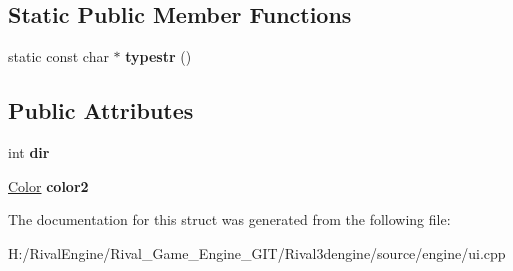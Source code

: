 \subsection*{Static Public Member Functions}
\begin{DoxyCompactItemize}
\item 
\mbox{\label{struct_u_i_1_1_gradient_a4ea53578f8b67fa10dc44a9646732561}} 
static const char $\ast$ {\bfseries typestr} ()
\end{DoxyCompactItemize}
\subsection*{Public Attributes}
\begin{DoxyCompactItemize}
\item 
\mbox{\label{struct_u_i_1_1_gradient_a1ab94b6c50df223a2716ac9b76a052cf}} 
int {\bfseries dir}
\item 
\mbox{\label{struct_u_i_1_1_gradient_a2be37ae45a06a0351a8c925c53a8e36f}} 
\hyperlink{struct_u_i_1_1_color}{Color} {\bfseries color2}
\end{DoxyCompactItemize}


The documentation for this struct was generated from the following file\+:\begin{DoxyCompactItemize}
\item 
H\+:/\+Rival\+Engine/\+Rival\+\_\+\+Game\+\_\+\+Engine\+\_\+\+G\+I\+T/\+Rival3dengine/source/engine/ui.\+cpp\end{DoxyCompactItemize}
